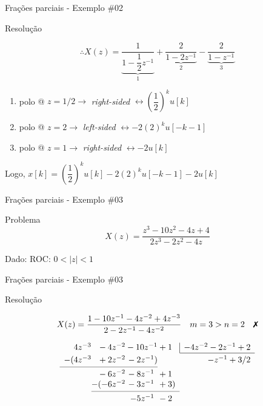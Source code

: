 \begin{frame}{Frações parciais - Exemplo \#02}
\begin{block}{Resolução}
	\begin{minipage}{0.45\linewidth}
		\[ \therefore X(z)=\underbrace{\dfrac{1}{1-\dfrac{1}{2}z^{-1}}}_{1}+\underbrace{\dfrac{2}{1-2z^{-1}}}_{2}-\underbrace{\dfrac{2}{1-z^{-1}}}_{3} \]
		
		\begin{enumerate}
			\item polo @ $ z=1/2 \rightarrow $ \textit{right-sided} $ \leftrightarrow \left( \dfrac{1}{2}\right) ^{k}u[k] $
			\item polo @ $ z=2 \rightarrow $ \textit{left-sided} $ \leftrightarrow -2(2)^{k}u[-k-1] $
			\item polo @ $ z=1 \rightarrow $ \textit{right-sided} $ \leftrightarrow -2u[k] $
		\end{enumerate}
	\end{minipage}
	\hfill
	\begin{minipage}{0.45\linewidth}
		\centering
		\scalebox{0.7}{}
	\end{minipage}
	
	Logo, $ x[k]=\left( \dfrac{1}{2}\right)^{k}u[k]-2(2)^{k}u[-k-1]-2u[k]  $
\end{block}
\end{frame}

\begin{frame}{Frações parciais - Exemplo \#03}
\begin{block}{Problema}
	\[ X(z)=\dfrac{z^{3}-10z^{2}-4z+4}{2z^{3}-2z^{2}-4z} \]
	
	Dado: ROC: $ 0<|z|<1 $
\end{block}
\end{frame}


\begin{frame}{Frações parciais - Exemplo \#03}
\begin{block}{Resolução}

    \[ X(z)=\dfrac{1-10z^{-1}-4z^{-2}+4z^{-3}}{2-2z^{-1}-4z^{-2}} \quad m=3>n=2\quad \text{\xmark} \]
    
    \vspace{0.5cm}
    
	\[ \begin{array}{r@{} r@{} r@{} r r}
	4z^{-3} &{}-4z^{-2} &{}-10z^{-1} 	&{}+1\Ph		& \multicolumn{1}{|c}{-4z^{-2}-2z^{-1}+2}\\\cline{5-5}
	-(4z^{-3} &{}+2z^{-2} &{}-2z^{-1})	&	&-z^{-1}+3/2\rule{0pt}{2.6ex}\\
	\cmidrule{1-3}
	&{}-6z^{-2} &{}-8z^{-1}\Ph	&{}+1\Ph\\
	&-(-6z^{-2}	&{}-3z^{-1}\Ph	&{}+3) \\
	\cmidrule{2-4}
	& 			&-5z^{-1}\Ph	&{}-2\Ph
	\end{array} \]
\end{block}
\end{frame}


